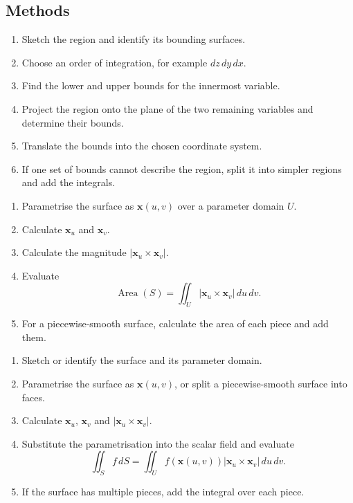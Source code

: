 \subsection{Methods}

\begin{nmeth}
  \begin{enumerate}\emph{}
    \item Sketch the region and identify its bounding surfaces.
    \item Choose an order of integration, for example $dz\,dy\,dx$.
    \item Find the lower and upper bounds for the innermost variable.
    \item Project the region onto the plane of the two remaining variables and determine their bounds.
    \item Translate the bounds into the chosen coordinate system.
    \item If one set of bounds cannot describe the region, split it into simpler regions and add the integrals.
  \end{enumerate}
\end{nmeth}

\begin{nmeth}
  \begin{enumerate} \emph{}
    \item Parametrise the surface as $\mathbf{x}(u,v)$ over a parameter domain $U$.
    \item Calculate $\mathbf{x}_u$ and $\mathbf{x}_v$.
    \item Calculate the magnitude $|\mathbf{x}_u\times\mathbf{x}_v|$.
    \item Evaluate
    \[
      \operatorname{Area}(S)=\iint_U
      |\mathbf{x}_u\times\mathbf{x}_v|\,du\,dv.
    \]
    \item For a piecewise-smooth surface, calculate the area of each piece and add them.
  \end{enumerate}
\end{nmeth}

\begin{nmeth}
  \begin{enumerate}\emph{}

    \item Sketch or identify the surface and its parameter domain.
    \item Parametrise the surface as $\mathbf{x}(u,v)$, or split a piecewise-smooth surface into faces.
    \item Calculate $\mathbf{x}_u$, $\mathbf{x}_v$ and $|\mathbf{x}_u\times\mathbf{x}_v|$.
    \item Substitute the parametrisation into the scalar field and evaluate
    \[
      \iint_S f\,dS
      =\iint_U f(\mathbf{x}(u,v))
      |\mathbf{x}_u\times\mathbf{x}_v|\,du\,dv.
    \]
    \item If the surface has multiple pieces, add the integral over each piece.
  \end{enumerate}
\end{nmeth}

